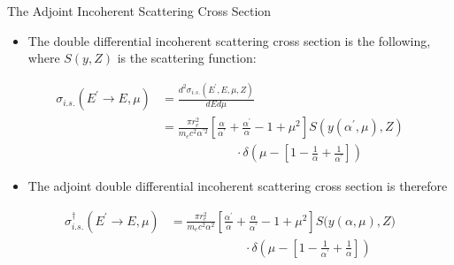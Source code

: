 \documentclass{beamer}
\begin{document}
\begin{frame}{The Adjoint Incoherent Scattering Cross Section}

  \begin{itemize}
    \item The double differential incoherent scattering cross section is the
      following, where $S(y,Z)$ is the scattering function:
  \end{itemize}
  \begin{align}
    \sigma_{i.s.}(E^{'} \to E, \mu) & = 
    \frac{d^2\sigma_{i.s.}(E^{'},E,\mu,Z)}{dEd\mu} \nonumber \\
    & =  \frac{\pi r_e^2}{m_ec^2 \alpha^{'2}}
    \left[\frac{\alpha}{\alpha^{'}} + \frac{\alpha^{'}}{\alpha} - 
      1 + \mu^2\right] S\left(y(\alpha^{'},\mu),Z\right) \nonumber \\
    & \qquad \qquad \qquad \cdot \delta\left(\mu - \left[1-\frac{1}{\alpha} + 
      \frac{1}{\alpha^{'}}\right]\right) \nonumber
  \end{align}

  \begin{itemize}
    \item The adjoint double differential incoherent scattering cross section
      is therefore
  \end{itemize}
   \begin{align}
    \sigma_{i.s.}^{\dagger}(E^{'} \to E, \mu)  & =  
    \frac{\pi r_e^2}{m_ec^2 \alpha^{2}}
    \left[\frac{\alpha^{'}}{\alpha} + \frac{\alpha}{\alpha^{'}} - 
      1 + \mu^2\right] S\Big(y(\alpha,\mu),Z\Big) \nonumber \\
    & \qquad \qquad \qquad \cdot \delta\left(\mu - \left[1-\frac{1}{\alpha^{'}} 
      + \frac{1}{\alpha}\right]\right) \nonumber
  \end{align}

\end{frame}
\end{document}
